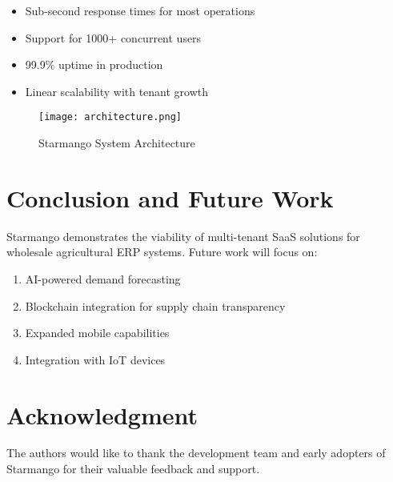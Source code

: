 \documentclass[conference]{IEEEtran}
\begin{document}
\begin{itemize}
    \item Sub-second response times for most operations
    \item Support for 1000+ concurrent users
    \item 99.9\% uptime in production
    \item Linear scalability with tenant growth
\end{itemize}

\begin{figure}[h]
    \centering
    \texttt{[image: architecture.png]}
    \caption{Starmango System Architecture}
    \label{fig:architecture}
    \end{figure}

\section{Conclusion and Future Work}
Starmango demonstrates the viability of multi-tenant SaaS solutions for wholesale agricultural ERP systems. Future work will focus on:

\begin{enumerate}
    \item AI-powered demand forecasting
    \item Blockchain integration for supply chain transparency
    \item Expanded mobile capabilities
    \item Integration with IoT devices
\end{enumerate}

\section*{Acknowledgment}
The authors would like to thank the development team and early adopters of Starmango for their valuable feedback and support.



\end{document}
